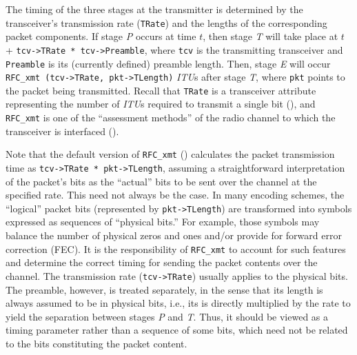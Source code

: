 \noindent
The timing of the three stages at the transmitter is
determined by the transceiver's transmission rate ({\tt TRate}) and the lengths
of the corresponding packet components.
If stage {\em P\/} occurs at time $t$, then stage {\em T\/} will take place
at $t$ + {\tt tcv->TRate * tcv->Preamble}, where {\tt tcv} is the transmitting
transceiver and {\tt Preamble} is its (currently defined) preamble length.
Then, stage {\em E\/} will occur {\tt RFC\_xmt (tcv->TRate, pkt->TLength)}
{\em ITU\/}s after stage {\em T}, where
{\tt pkt} points to the packet being transmitted.
Recall that {\tt TRate} is a transceiver attribute representing the number of
{\em ITU\/}s required to transmit a single bit (), and
{\tt RFC\_xmt} is one of the ``assessment methods'' of the radio channel to
which the transceiver is interfaced ().

Note that the default version of {\tt RFC\_xmt} ()
calculates the packet transmission time as {\tt tcv->TRate * pkt->TLength},
assuming a straightforward interpretation of the packet's bits as the
``actual'' bits to be sent over the channel at the specified rate.
This need not always be the case.
In many encoding schemes, the ``logical''
packet bits (represented by {\tt pkt->TLength})
are transformed into symbols expressed as sequences of ``physical bits.''
For example, those symbols may balance the number of physical zeros and ones
and/or provide for forward error correction (FEC).
It is the responsibility of {\tt RFC\_xmt} to account for such features and
determine the correct timing for sending the packet contents over the channel.
The transmission rate ({\tt tcv->TRate}) usually applies to the physical
bits.
The preamble, however, is treated separately, in the sense that its length
is always
assumed to be in physical bits, i.e., its is directly multiplied by the
rate to yield the separation between stages {\em P\/} and {\em T}.
Thus, it should be viewed as a timing parameter rather than a sequence of
some bits, which need not be related to the bits constituting the packet
content.

